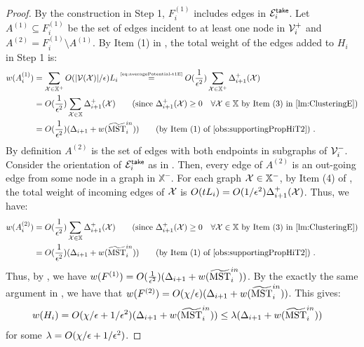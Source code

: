 \begin{proof}
By the construction in Step 1, $F^{(1)}_i$ includes edges in $\mathcal{E}_i^{\mathsf{take}}$. 	Let $A^{(1)}\subseteq F^{(1)}_i$  be the set of edges incident to at least one node in $\mathcal{V}_i^{+}$ and $A^{(2)}=F^{(1)}_i\setminus A^{(1)}$.  By Item (1) in , the total weight of the edges added to $H_i$ in Step 1 is:
	\begin{equation}\label{eq:A1TE}
		\begin{split}
			w(A^{(1)}_i)  &=  \sum_{\mx \in \mathbb{X}^{+}} O(|\mv(\mx)|/\eps) L_i \stackrel{\mbox{\tiny{\cref{eq:averagePotential-t1E}}}}{=}  O(\frac{1}{\eps^2})\sum_{\mx \in \mathbb{X}^{+}} \Delta^+_{i+1}(\mx)\\
			&= O(\frac{1}{\eps^2})\sum_{\mx \in\mathbb{X}} \Delta^+_{i+1}(\mx)  \qquad \mbox{(since $\Delta^+_{i+1}(\mx)\geq 0 \quad \forall \mx \in \mathbb{X}$  by Item (3) in \Cref{lm:ClusteringE})} \\
			&= O(\frac{1}{\eps^2})(\Delta_{i+1} + w(\msttilde^{in}_i)) \qquad \mbox{(by Item (1) of \Cref{obs:supportingPropHiT2})}~.
		\end{split}
	\end{equation}   
By definition 	$A^{(2)}$ is the set of edges with both endpoints in subgraphs of $\mathcal{V}_i^{-}$. Consider the orientation of $\mathcal{E}^{\mathsf{take}}_i$ as in . Then, every edge of $A^{(2)}$ is an out-going edge from some node in a  graph in $\mathbb{X}^{-}$. For each graph $\mathcal{X} \in \mathbb{X}^{-}$, by Item (4) of , the total weight of incoming edges of $\mathcal{X}$ is $O(t L_i) = O(1/\epsilon^2)\Delta^{+}_{i+1}(\mathcal{X})$. Thus,  we have:
\begin{equation}\label{eq:A2TE}
	\begin{split}
		w(A^{(2)}_i)  &= O(\frac{1}{\eps^2})\sum_{\mx \in\mathbb{X}} \Delta^+_{i+1}(\mx)  \qquad \mbox{(since $\Delta^+_{i+1}(\mx)\geq 0 \quad \forall \mx \in \mathbb{X}$  by Item (3) in \Cref{lm:ClusteringE})} \\
		&= O(\frac{1}{\eps^2})(\Delta_{i+1} + w(\msttilde^{in}_i)) \qquad \mbox{(by Item (1) of \Cref{obs:supportingPropHiT2})}~.
	\end{split}
\end{equation}  
 Thus, by , we have $w(F^{(1)}) = O(\frac{1}{\epsilon^2})(\Delta_{i+1} + w(\widetilde{\mathrm{MST}}^{in}_i))$. By the exactly the same argument in , we have that $w(F^{(2)}) =O(\chi/\epsilon)(\Delta_{i+1} + w(\widetilde{\mathrm{MST}}^{in}_i)) $. This gives: 
\begin{equation}\label{eq:Hi-nondegenT1E}
		\begin{split}
			w(H_i) &=  O(\chi/\epsilon + 1/\epsilon^2) (\Delta_{i+1} + w(\widetilde{\mathrm{MST}}^{in}_i)) \leq \lambda(\Delta_{i+1} + w(\widetilde{\mathrm{MST}}^{in}_i))
		\end{split}
	\end{equation} 
	for some $\lambda =  O(\chi/\epsilon + 1/\epsilon^2) $.
	

\end{proof}
